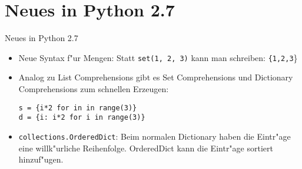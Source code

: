 \section{Neues in Python 2.7}

\begin{frame}[fragile]{Neues in Python 2.7}

\begin{itemize}
\item Neue Syntax f"ur Mengen: Statt \texttt{set(1, 2, 3)} kann man schreiben: \texttt{\{1,2,3}\}
\item Analog zu List Comprehensions gibt es Set Comprehensions und Dictionary Comprehensions zum schnellen Erzeugen:
\begin{lstlisting}
s = {i*2 for in in range(3)}
d = {i: i*2 for i in range(3)}
\end{lstlisting}
\item \texttt{collections.OrderedDict}: Beim normalen Dictionary haben die Eintr"age eine willk"urliche Reihenfolge. OrderedDict kann die Eintr"age sortiert hinzuf"ugen.
\end{itemize}

\end{frame}
